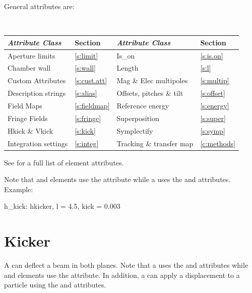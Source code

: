 General   attributes are:
\begin{center}
\tt
\begin{tabular}{llll} \toprule
  {\sl Attribute Class}      & Section           & {\sl Attribute Class}      & Section         \\ \midrule
  Aperture limits            & \ref{s:limit}     & Is_on                      & \ref{s:is.on}   \\
  Chamber wall               & \ref{s:wall}      & Length                     & \ref{s:l}       \\
  Custom Attributes          & \ref{s:cust.att}  & Mag \& Elec multipoles     & \ref{s:multip}  \\
  Description strings        & \ref{s:alias}     & Offsets, pitches \& tilt   & \ref{s:offset}  \\
  Field Maps                 & \ref{s:fieldmap}  & Reference energy           & \ref{s:energy}  \\ 
  Fringe Fields              & \ref{s:fringe}    & Superposition              & \ref{s:super}   \\
  Hkick \& Vkick             & \ref{s:kick}      & Symplectify                & \ref{s:symp}    \\
  Integration settings       & \ref{s:integ}     & Tracking \& transfer map   & \ref{c:methods} \\
  \bottomrule
\end{tabular}
\end{center}
\toffset
See  for a full list of element attributes.

Note that  and  elements use the
 attribute while a  uses the  and  
attributes. Example:
\begin{example}
  h_kick: hkicker, l = 4.5, kick = 0.003
\end{example}

\section{Kicker}
\label{s:kicker}

A  can deflect a beam in both planes. Note that a  uses the  and
 attributes while  and  elements use the  attribute.  In
addition, a  can apply a displacement to a particle using the  and
 attributes.

